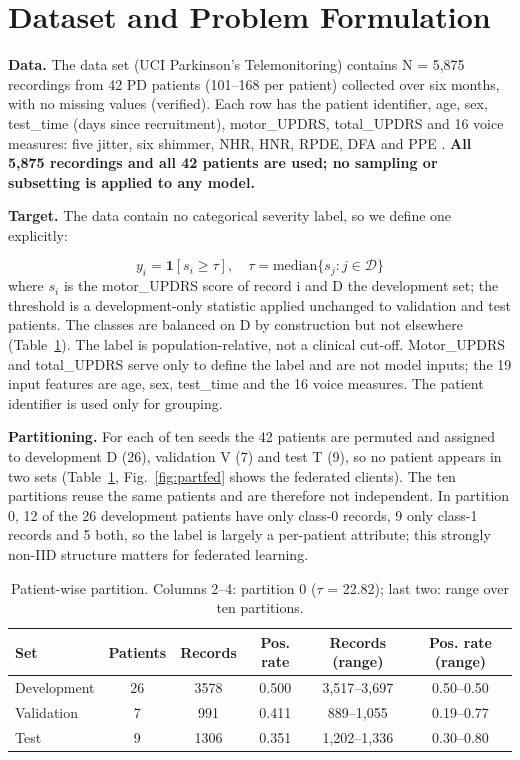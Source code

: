 \documentclass[conference,a4paper]{IEEEtran}
\begin{document}
\section{Dataset and Problem Formulation}
\textbf{Data.} The data set (UCI Parkinson's Telemonitoring) contains N = 5,875 recordings from 42 PD patients (101--168 per patient) collected over six months, with no missing values (verified). Each row has the patient identifier, age, sex, test\_time (days since recruitment), motor\_UPDRS, total\_UPDRS and 16 voice measures: five jitter, six shimmer, NHR, HNR, RPDE, DFA and PPE \cite{tsanas2010}. \textbf{All 5,875 recordings and all 42 patients are used; no sampling or subsetting is applied to any model.}

\textbf{Target.} The data contain no categorical severity label, so we define one explicitly:

\begin{equation}y_i=\mathbf{1}[s_i\ge\tau],\quad \tau=\mathrm{median}\{s_j: j\in\mathcal{D}\}\label{eq:y}\end{equation}
where $s_{i}$ is the motor\_UPDRS score of record i and D the development set; the threshold is a development-only statistic applied unchanged to validation and test patients. The classes are balanced on D by construction but not elsewhere (Table~\ref{tab:data}). The label is population-relative, not a clinical cut-off. Motor\_UPDRS and total\_UPDRS serve only to define the label and are not model inputs; the 19 input features are age, sex, test\_time and the 16 voice measures. The patient identifier is used only for grouping.

\textbf{Partitioning.} For each of ten seeds the 42 patients are permuted and assigned to development D (26), validation V (7) and test T (9), so no patient appears in two sets (Table~\ref{tab:data}, Fig.~\ref{fig:partfed} shows the federated clients). The ten partitions reuse the same patients and are therefore not independent. In partition 0, 12 of the 26 development patients have only class-0 records, 9 only class-1 records and 5 both, so the label is largely a per-patient attribute; this strongly non-IID structure matters for federated learning.

\begin{table}[!t]\centering\caption{Patient-wise partition. Columns 2--4: partition 0 ($\tau$ = 22.82); last two: range over ten partitions.}\label{tab:data}\scriptsize\setlength{\tabcolsep}{2pt}
\begin{tabular}{lccccc}\toprule
Set & Patients & Records & Pos. rate & Records (range) & Pos. rate (range)\\\midrule
Development & 26 & 3578 & 0.500 & 3,517--3,697 & 0.50--0.50\\
Validation & 7 & 991 & 0.411 & 889--1,055 & 0.19--0.77\\
Test & 9 & 1306 & 0.351 & 1,202--1,336 & 0.30--0.80\\
\bottomrule\end{tabular}\end{table}
\end{document}
